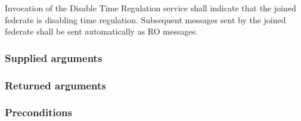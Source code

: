 \begin{compactstdpage}
    Invocation of the Disable Time Regulation service shall indicate that the joined federate is disabling time regulation. Subsequent messages sent by the joined federate shall be sent automatically as RO messages.

    \subsubsection{Supplied arguments}


    \subsubsection{Returned arguments}


    \subsubsection{Preconditions}



\end{compactstdpage}

\clearpage


